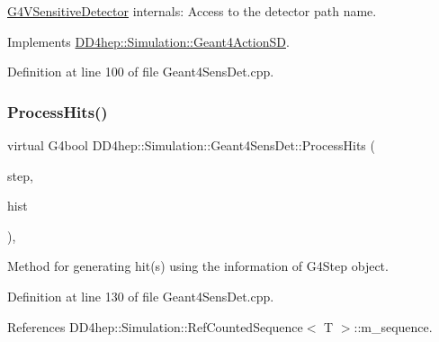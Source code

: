 \hyperlink{class_g4_v_sensitive_detector}{G4\+V\+Sensitive\+Detector} internals\+: Access to the detector path name. 



Implements \hyperlink{class_d_d4hep_1_1_simulation_1_1_geant4_action_s_d_a8d3333538a535ac963931173f15acfeb}{D\+D4hep\+::\+Simulation\+::\+Geant4\+Action\+SD}.



Definition at line 100 of file Geant4\+Sens\+Det.\+cpp.

\hypertarget{class_d_d4hep_1_1_simulation_1_1_geant4_sens_det_aafdd578f5e7d1ac5885a715b9a101567}{}\label{class_d_d4hep_1_1_simulation_1_1_geant4_sens_det_aafdd578f5e7d1ac5885a715b9a101567} 
\subsubsection{\texorpdfstring{Process\+Hits()}{ProcessHits()}}
{\footnotesize\ttfamily virtual G4bool D\+D4hep\+::\+Simulation\+::\+Geant4\+Sens\+Det\+::\+Process\+Hits (\begin{DoxyParamCaption}\item[{G4\+Step $\ast$}]{step,  }\item[{G4\+Touchable\+History $\ast$}]{hist }\end{DoxyParamCaption})\hspace{0.3cm}{\ttfamily [inline]}, {\ttfamily [virtual]}}



Method for generating hit(s) using the information of G4\+Step object. 



Definition at line 130 of file Geant4\+Sens\+Det.\+cpp.



References D\+D4hep\+::\+Simulation\+::\+Ref\+Counted\+Sequence$<$ T $>$\+::m\+\_\+sequence.

\hypertarget{class_d_d4hep_1_1_simulation_1_1_geant4_sens_det_a37cc84389484532daeb6fd0b28b53ca6}{}\label{class_d_d4hep_1_1_simulation_1_1_geant4_sens_det_a37cc84389484532daeb6fd0b28b53ca6} 
